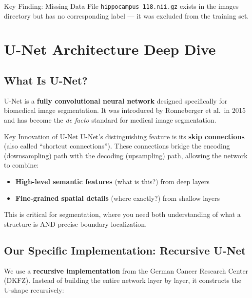 \documentclass[12pt,a4paper]{report}
\begin{document}
\begin{warningbox}{Key Finding: Missing Data}
File \texttt{hippocampus\_118.nii.gz} exists in the images directory but has no corresponding label --- it was excluded from the training set.
\end{warningbox}


\chapter{U-Net Architecture Deep Dive}

\section{What Is U-Net?}

U-Net is a \textbf{fully convolutional neural network} designed specifically for biomedical image segmentation. It was introduced by Ronneberger et al.\ in 2015 and has become the \textit{de facto} standard for medical image segmentation.

\begin{conceptbox}{Key Innovation of U-Net}
U-Net's distinguishing feature is its \textbf{skip connections} (also called ``shortcut connections''). These connections bridge the encoding (downsampling) path with the decoding (upsampling) path, allowing the network to combine:
\begin{itemize}
    \item \textbf{High-level semantic features} (what is this?) from deep layers
    \item \textbf{Fine-grained spatial details} (where exactly?) from shallow layers
\end{itemize}
This is critical for segmentation, where you need both understanding of what a structure is AND precise boundary localization.
\end{conceptbox}

\section{Our Specific Implementation: Recursive U-Net}

We use a \textbf{recursive implementation} from the German Cancer Research Center (DKFZ). Instead of building the entire network layer by layer, it constructs the U-shape recursively:
\end{document}
